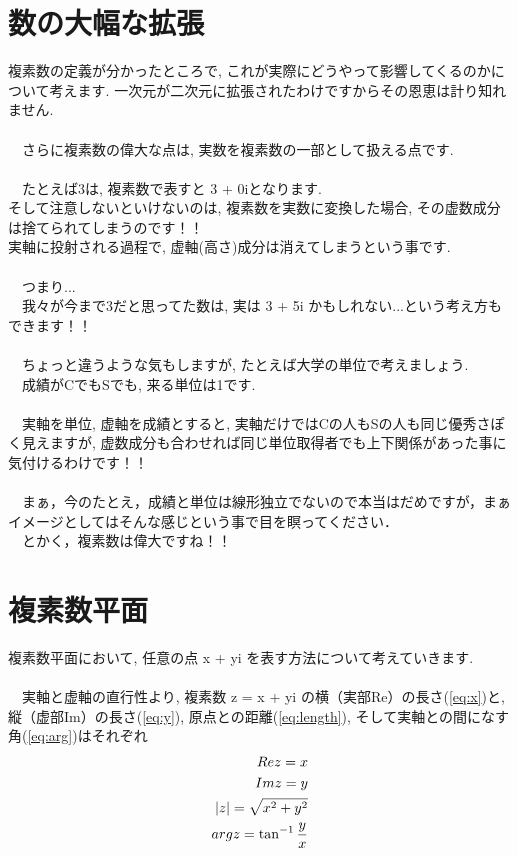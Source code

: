 \documentclass[11pt,a4paper]{ujreport}
\begin{document}
\section{数の大幅な拡張}
複素数の定義が分かったところで, これが実際にどうやって影響してくるのかについて考えます. 一次元が二次元に拡張されたわけですからその恩恵は計り知れません. \\
\\
　さらに複素数の偉大な点は, 実数を複素数の一部として扱える点です.\\
\\
　たとえば3は, 複素数で表すと 3 + 0iとなります.\\
そして注意しないといけないのは, 複素数を実数に変換した場合, その虚数成分は捨てられてしまうのです！！\\
実軸に投射される過程で, 虚軸(高さ)成分は消えてしまうという事です.\\
\\
　つまり...\\
　我々が今まで3だと思ってた数は, 実は 3 + 5i かもしれない...という考え方もできます！！\\
\\
　ちょっと違うような気もしますが, たとえば大学の単位で考えましょう.\\
　成績がCでもSでも, 来る単位は1です.\\
\\
　実軸を単位, 虚軸を成績とすると, 実軸だけではCの人もSの人も同じ優秀さぽく見えますが, 虚数成分も合わせれば同じ単位取得者でも上下関係があった事に気付けるわけです！！\\
\\
　まぁ，今のたとえ，成績と単位は線形独立でないので本当はだめですが，まぁイメージとしてはそんな感じという事で目を瞑ってください．
\\
　とかく，複素数は偉大ですね！！
\\

\section{複素数平面}
複素数平面において, 任意の点 x + yi を表す方法について考えていきます. \\
\\
　実軸と虚軸の直行性より, 複素数 z = x + yi の横（実部Re）の長さ(\ref{eq:x})と, 縦（虚部Im）の長さ(\ref{eq:y}), 原点との距離(\ref{eq:length}), そして実軸との間になす角(\ref{eq:arg})はそれぞれ
\begin{eqnarray}
\label{eq:vector}
\mathstrut Re z = x
\label{eq:x}
\\
\mathstrut Im z = y
\label{eq:y}
\\
|z| = \sqrt{x^2 + y^2}
\label{eq:length}\\
\mathstrut arg z = \tan^{-1} \frac{y}{x}
\label{eq:arg}
\end{eqnarray}
\end{document}
